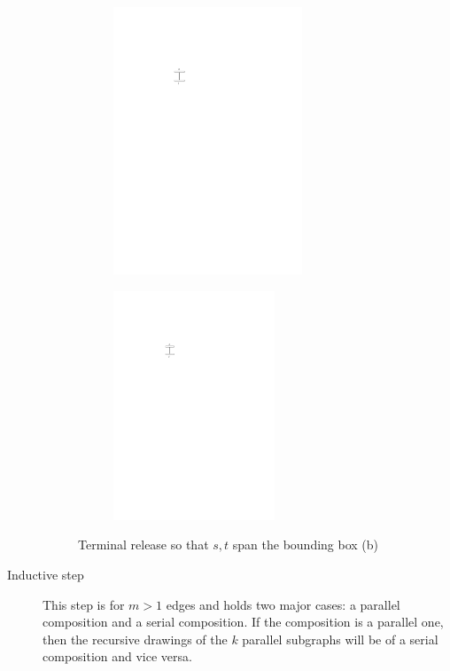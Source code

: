 \begin{description}
		\begin{figure}[H]
	\centering
	\begin{subfigure}{0.4\linewidth}
		\centering
		\includegraphics[width=0.7\textwidth,page=2]{drawings/2-trees.pdf}
		\caption{}
	\end{subfigure}
	\begin{subfigure}{0.4\linewidth}
	\centering
	\includegraphics[width=0.6\textwidth,page=3]{drawings/2-trees.pdf}
	\caption{}
\end{subfigure}
	\caption{Terminal release so that $s,t$ span the bounding box (b)}\label{im:SP_terminal-release}
\end{figure}
	\item[Inductive step] This step is for $m>1$ edges and holds two major cases: a parallel composition and a serial composition. If the composition is a parallel one, then the recursive drawings of the $k$ parallel subgraphs will be of a serial composition and vice versa.


\end{description}
